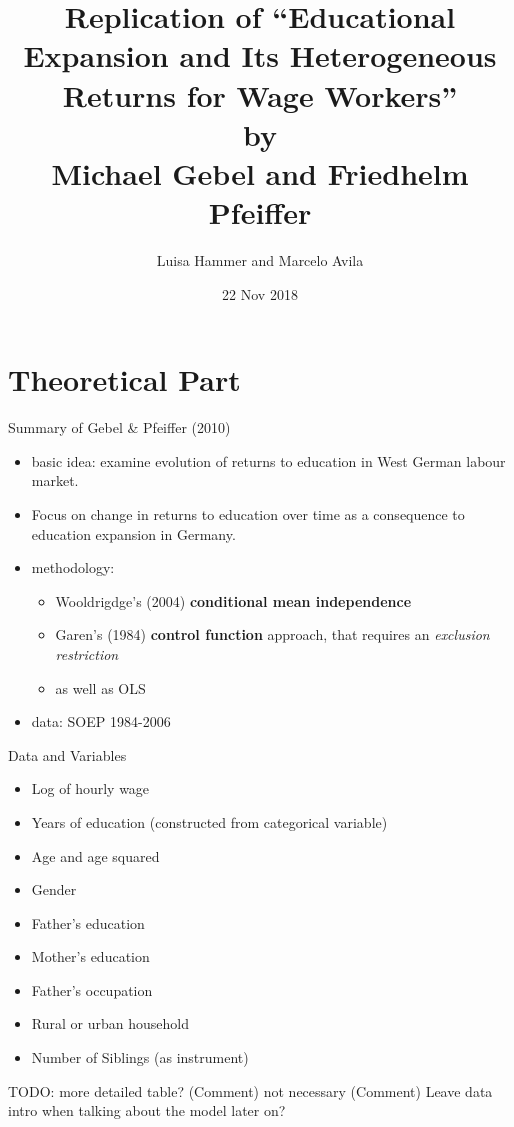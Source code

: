 \documentclass[10pt,ignorenonframetext,]{beamer}
\title{Replication of ``Educational Expansion and Its Heterogeneous Returns for
Wage Workers''\\
by\\
Michael Gebel and Friedhelm Pfeiffer}
\author{Luisa Hammer and Marcelo Avila}
\date{22 Nov 2018}
\providecommand{\tightlist}{%
  \setlength{\itemsep}{0pt}\setlength{\parskip}{0pt}}
\begin{document}
\frame{\titlepage}

\hypertarget{theoretical-part}{%
\section{Theoretical Part}\label{theoretical-part}}

\begin{frame}{Summary of Gebel \& Pfeiffer (2010)}
\protect\hypertarget{summary-of-gebel-pfeiffer-2010}{}

\begin{itemize}
\tightlist
\item
  basic idea: examine evolution of returns to education in West German
  labour market.
\item
  Focus on change in returns to education over time as a consequence to
  education expansion in Germany.
\item
  methodology:

  \begin{itemize}
  \tightlist
  \item
    Wooldrigdge's (2004) \textbf{conditional mean independence}
  \item
    Garen's (1984) \textbf{control function} approach, that requires an
    \emph{exclusion restriction}
  \item
    as well as OLS
  \end{itemize}
\item
  data: SOEP 1984-2006
\end{itemize}

\end{frame}

\begin{frame}{Data and Variables}
\protect\hypertarget{data-and-variables}{}

\begin{itemize}
\tightlist
\item
  Log of hourly wage
\item
  Years of education (constructed from categorical variable)
\item
  Age and age squared
\item
  Gender
\item
  Father's education
\item
  Mother's education
\item
  Father's occupation
\item
  Rural or urban household
\item
  Number of Siblings (as instrument)
\end{itemize}

TODO: more detailed table? (Comment) not necessary (Comment) Leave data
intro when talking about the model later on?

\end{frame}
\end{document}
